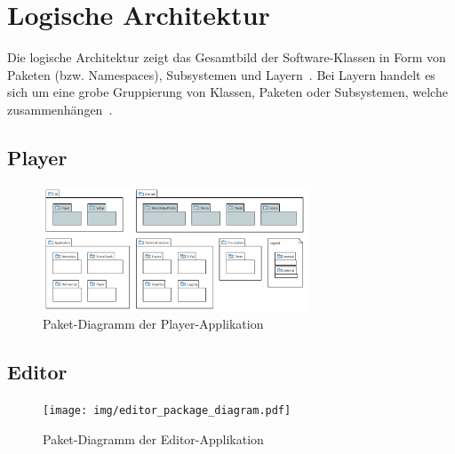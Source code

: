 
\section{Logische Architektur}
\label{sec:logical-architecture}

Die logische Architektur zeigt das Gesamtbild der Software-Klassen in Form von
Paketen (bzw. Namespaces), Subsystemen und Layern~\cite{larman_applying_2004}.
Bei Layern handelt es sich um eine grobe Gruppierung von Klassen, Paketen oder
Subsystemen, welche zusammenhängen~\cite{larman_applying_2004}.

\subsection{Player}
\label{subsec:package-diagram:player}

\begin{figure}[H]
    \centering
    \includegraphics[width=0.7\textwidth]{img/player_package_diagram.pdf}
    \caption{Paket-Diagramm der
        Player-Applikation\protect\footnotemark}\label{fig:package-diagram:player}
\end{figure}


\subsection{Editor}
\label{subsec:package-diagram:editor}

\begin{figure}[H]
    \centering
    \texttt{[image: img/editor\_package\_diagram.pdf]}
    \caption{Paket-Diagramm der
        Editor-Applikation\protect\footnotemark}\label{fig:package-diagram:editor}
\end{figure}

